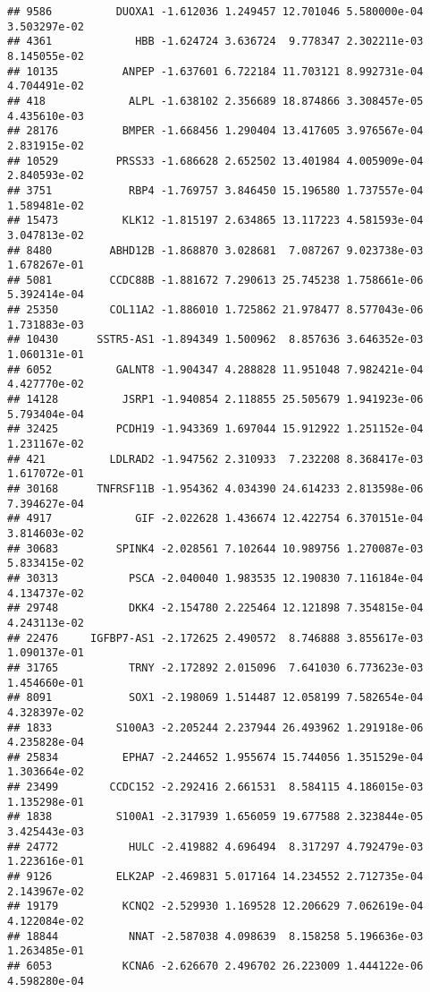 \documentclass[
]{article}
\begin{document}
\begin{verbatim}
## 9586          DUOXA1 -1.612036 1.249457 12.701046 5.580000e-04 3.503297e-02
## 4361             HBB -1.624724 3.636724  9.778347 2.302211e-03 8.145055e-02
## 10135          ANPEP -1.637601 6.722184 11.703121 8.992731e-04 4.704491e-02
## 418             ALPL -1.638102 2.356689 18.874866 3.308457e-05 4.435610e-03
## 28176          BMPER -1.668456 1.290404 13.417605 3.976567e-04 2.831915e-02
## 10529         PRSS33 -1.686628 2.652502 13.401984 4.005909e-04 2.840593e-02
## 3751            RBP4 -1.769757 3.846450 15.196580 1.737557e-04 1.589481e-02
## 15473          KLK12 -1.815197 2.634865 13.117223 4.581593e-04 3.047813e-02
## 8480         ABHD12B -1.868870 3.028681  7.087267 9.023738e-03 1.678267e-01
## 5081         CCDC88B -1.881672 7.290613 25.745238 1.758661e-06 5.392414e-04
## 25350        COL11A2 -1.886010 1.725862 21.978477 8.577043e-06 1.731883e-03
## 10430      SSTR5-AS1 -1.894349 1.500962  8.857636 3.646352e-03 1.060131e-01
## 6052          GALNT8 -1.904347 4.288828 11.951048 7.982421e-04 4.427770e-02
## 14128          JSRP1 -1.940854 2.118855 25.505679 1.941923e-06 5.793404e-04
## 32425         PCDH19 -1.943369 1.697044 15.912922 1.251152e-04 1.231167e-02
## 421          LDLRAD2 -1.947562 2.310933  7.232208 8.368417e-03 1.617072e-01
## 30168      TNFRSF11B -1.954362 4.034390 24.614233 2.813598e-06 7.394627e-04
## 4917             GIF -2.022628 1.436674 12.422754 6.370151e-04 3.814603e-02
## 30683         SPINK4 -2.028561 7.102644 10.989756 1.270087e-03 5.833415e-02
## 30313           PSCA -2.040040 1.983535 12.190830 7.116184e-04 4.134737e-02
## 29748           DKK4 -2.154780 2.225464 12.121898 7.354815e-04 4.243113e-02
## 22476     IGFBP7-AS1 -2.172625 2.490572  8.746888 3.855617e-03 1.090137e-01
## 31765           TRNY -2.172892 2.015096  7.641030 6.773623e-03 1.454660e-01
## 8091            SOX1 -2.198069 1.514487 12.058199 7.582654e-04 4.328397e-02
## 1833          S100A3 -2.205244 2.237944 26.493962 1.291918e-06 4.235828e-04
## 25834          EPHA7 -2.244652 1.955674 15.744056 1.351529e-04 1.303664e-02
## 23499        CCDC152 -2.292416 2.661531  8.584115 4.186015e-03 1.135298e-01
## 1838          S100A1 -2.317939 1.656059 19.677588 2.323844e-05 3.425443e-03
## 24772           HULC -2.419882 4.696494  8.317297 4.792479e-03 1.223616e-01
## 9126          ELK2AP -2.469831 5.017164 14.234552 2.712735e-04 2.143967e-02
## 19179          KCNQ2 -2.529930 1.169528 12.206629 7.062619e-04 4.122084e-02
## 18844           NNAT -2.587038 4.098639  8.158258 5.196636e-03 1.263485e-01
## 6053           KCNA6 -2.626670 2.496702 26.223009 1.444122e-06 4.598280e-04

\end{verbatim}
\end{document}
